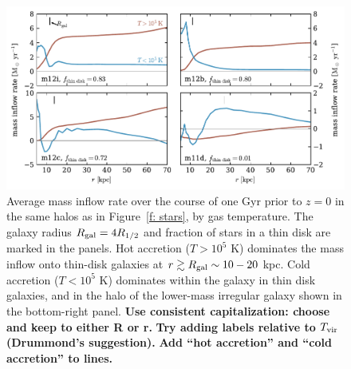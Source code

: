 \documentclass[fleqn,usenatbib]{mnras}
\begin{document}





\appendix
\section{}
\begin{figure}
    \centering
    \includegraphics{figures/Mdot.pdf}
    \caption{
    Average mass inflow rate over the course of one Gyr prior to $z=0$ in the same halos as in Figure~\ref{f: stars}, by gas temperature. The galaxy radius $R_{\rm gal}=4 R_{1/2}$ and fraction of stars in a thin disk are marked in the panels. 
    Hot accretion ($T>10^5$ K) dominates the mass inflow onto thin-disk galaxies at $r \gtrsim R_{\rm gal} \sim 10-20$ kpc.
    Cold accretion ($T<10^5$ K) dominates within the galaxy in thin disk galaxies, and in the halo of the lower-mass irregular galaxy shown in the bottom-right panel.
    \textbf{Use consistent capitalization: choose and keep to either R or r.}
    \textbf{Try adding labels relative to $T_{\rm vir}$ (Drummond's suggestion).}
    \textbf{Add ``hot accretion'' and ``cold accretion'' to lines.}
    }
    \label{f: Mdot}
\end{figure}
\end{document}

